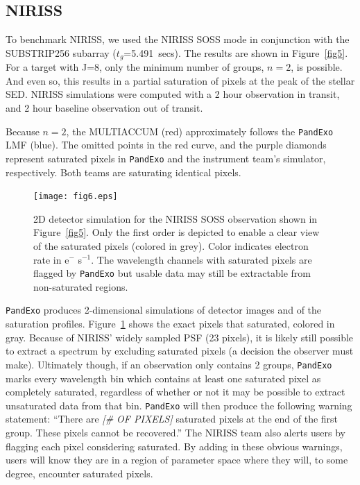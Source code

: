 \documentclass[iop]{emulateapj}
\begin{document}
\subsection{NIRISS}
To benchmark NIRISS, we used the NIRISS SOSS mode in conjunction with the SUBSTRIP256 subarray ($t_g$=5.491~secs). The results are shown in Figure~\ref{fig5}. For a target with J=8, only the minimum number of groups, $n=2$, is possible. And even so, this results in a partial saturation of pixels at the peak of the stellar SED. NIRISS simulations were computed with a 2 hour observation in transit, and 2 hour baseline observation out of transit. 

Because $n=2$, the MULTIACCUM (red) approximately follows the \texttt{PandExo} LMF (blue). The omitted points in the red curve, and the purple diamonds represent saturated pixels in \texttt{PandExo} and the instrument team's simulator, respectively. Both teams are saturating identical pixels. 

\begin{figure}[ht]
 \texttt{[image: fig6.eps]}
\caption{2D detector simulation for the NIRISS SOSS observation shown in Figure~\ref{fig5}. Only the first order is depicted to enable a clear view of the saturated pixels (colored in grey). Color indicates electron rate in e$^-$ s$^{-1}$. The wavelength channels with saturated pixels are flagged by \texttt{PandExo} but usable data may still be extractable from non-saturated regions.\label{fig6}}
\end{figure}
\texttt{PandExo} produces 2-dimensional simulations of detector images and of the saturation profiles. Figure~\ref{fig6} shows the exact pixels that saturated, colored in gray. Because of NIRISS' widely sampled PSF (23 pixels), it is likely still possible to extract a spectrum by excluding saturated pixels (a decision the observer must make). Ultimately though, if an observation only contains 2 groups, \texttt{PandExo} marks every wavelength bin which contains at least one saturated pixel as completely saturated, regardless of whether or not it may be possible to extract unsaturated data from that bin. \texttt{PandExo} will then produce the following warning statement: ``There are \emph{[\# OF PIXELS]} saturated pixels at the end of the first group. These pixels cannot be recovered.''  The NIRISS team also alerts users by flagging each pixel considering saturated. By adding in these obvious warnings, users will know they are in a region of parameter space where they will, to some degree, encounter saturated pixels. 
\end{document}

